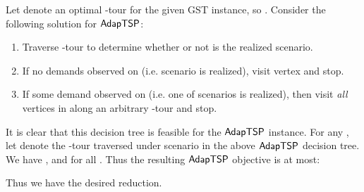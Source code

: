 \documentclass[11pt]{article}
\def\stsp{\ensuremath{{\sf AdapTSP}}\xspace}
\def\mgs{{\sf GST}\xspace}
\newenvironment{pf}{

\noindent{\bf Proof:}} {\hfill


}
\begin{document}
\begin{pf}
 Let  denote an optimal
  -tour for the given \mgs instance, so . Consider the
  following solution for \stsp:
  \begin{enumerate}
  \item Traverse -tour  to determine whether or not  is
    the realized scenario.
  \item If no demands observed on  (i.e. scenario  is realized), visit vertex  and stop.
  \item If some demand observed on  (i.e. one of scenarios  is realized), then visit {\em all} vertices in  along an
    arbitrary -tour and stop.
   \end{enumerate}
It is clear that this  decision tree is feasible for the \stsp instance.  For any , let  denote the
-tour traversed under scenario  in the above \stsp  decision tree. We have
  , and
   for all . Thus the resulting \stsp objective is
  at most:
  
  Thus we have the desired reduction.
\end{pf}
\end{document}
